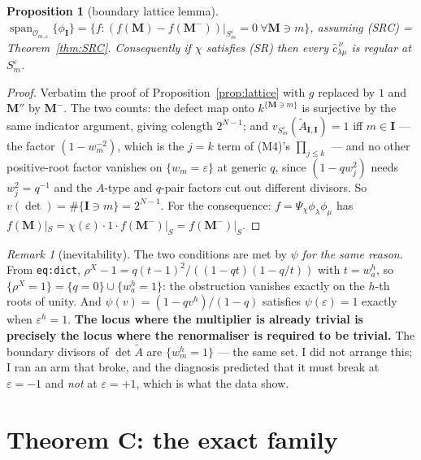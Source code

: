 \documentclass[11pt]{article}
\theoremstyle{plain}
\newtheorem{prop}[thm]{Proposition}
\theoremstyle{definition}
\theoremstyle{remark}
\newtheorem{rem}[thm]{Remark}
\theoremstyle{plain}
\newcommand{\bI}{\mathbf{I}}
\newcommand{\bM}{\mathbf{M}}
\newcommand{\At}{\widetilde{A}}
\begin{document}
\begin{prop}[boundary lattice lemma]\label{prop:short}
$\operatorname{span}_{\mathcal{O}_{m,\varepsilon}}\{\phi_{\bI}\}
 =\{f:(f(\bM)-f(\bM^{-}))|_{S_m^\varepsilon}=0\ \forall \bM\ni m\}$,
assuming \textup{(SRC)} = Theorem~\ref{thm:SRC}.  Consequently if $\chi$ satisfies \textup{(SR)} then
every $\widehat c^{\,\nu}_{\lambda\mu}$ is regular at $S_m^{\varepsilon}$.
\end{prop}
\begin{proof}
Verbatim the proof of Proposition~\ref{prop:lattice} with $g$ replaced by $1$ and
$\bM''$ by $\bM^-$.  The two counts: the defect map onto
$k^{\{\bM\ni m\}}$ is surjective by the same indicator argument, giving colength
$2^{N-1}$; and $v_{S_m^\varepsilon}(\At_{\bI,\bI})=1$ iff $m\in\bI$ --- the
factor $(1-w_m^{-2})$, which is the $j=k$ term of (M4)'s $\prod_{j\le k}$ --- and
no other positive-root factor vanishes on $\{w_m=\varepsilon\}$ at generic $q$,
since $(1-qw_j^2)$ needs $w_j^2=q^{-1}$ and the $A$-type and $q$-pair factors cut
out different divisors.  So $v(\det)=\#\{\bI\ni m\}=2^{N-1}$.  For the
consequence: $f=\Psi_\chi\phi_\lambda\phi_\mu$ has
$f(\bM)|_{S}=\chi(\varepsilon)\cdot1\cdot f(\bM^-)|_{S}=f(\bM^-)|_{S}$.
\end{proof}

\begin{rem}[inevitability]\label{rem:inev}
The two conditions are met by $\psi$ \emph{for the same reason}.  From
\texttt{eq:dict},
$\rho^X-1=q(t-1)^2/((1-qt)(1-q/t))$ with $t=w_a^h$, so
$\{\rho^X=1\}=\{q=0\}\cup\{w_a^{h}=1\}$: the obstruction vanishes exactly on the
$h$-th roots of unity.  And $\psi(v)=(1-qv^h)/(1-q)$ satisfies $\psi(\varepsilon)=1$
exactly when $\varepsilon^{h}=1$.  \textbf{The locus where the multiplier is
already trivial is precisely the locus where the renormaliser is required to be
trivial.}  The boundary divisors of $\det\At$ are $\{w_m^{h}=1\}$ --- the same
set.  I did not arrange this; I ran an arm that broke, and the diagnosis
predicted that it must break at $\varepsilon=-1$ and \emph{not} at
$\varepsilon=+1$, which is what the data show.
\end{rem}

\section{Theorem C: the exact family}
\end{document}
